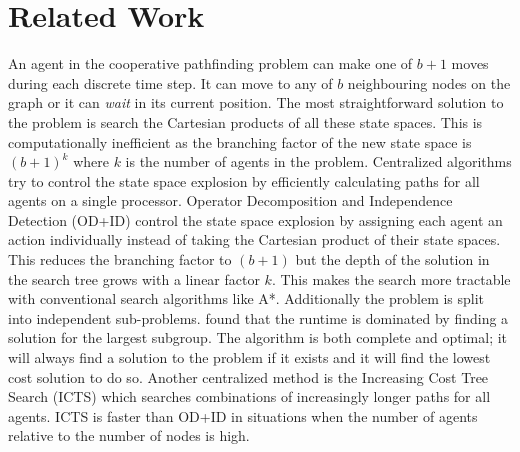\section{Related Work}\label{sec:related}
An agent in the cooperative pathfinding problem can make one of $b+1$ moves 
during each discrete time step. It can move to any of $b$ neighbouring nodes on 
the graph or it can \emph{wait} in its current position. The most 
straightforward 
solution to the problem is search the Cartesian products of all these state 
spaces. This is computationally inefficient \cite{hopcroft1984,sharon2013} as 
the branching factor of the new state space is $(b+1)^k$ where $k$ is the 
number of agents in the problem. Centralized algorithms try to control the 
state space explosion by efficiently calculating paths for all agents on a 
single processor. Operator Decomposition and Independence Detection (OD+ID) 
\cite{standley2010,standley2011} control the state space explosion by 
assigning each agent an action individually instead of taking the Cartesian 
product of their state spaces. This reduces the branching factor to $(b+1)$ but 
the depth of the solution in the search tree grows with a linear factor $k$. 
This makes the search more tractable with conventional search algorithms like 
A*. Additionally the problem is split into independent sub-problems.
\cite{standley2010} found that the runtime is dominated by finding a solution 
for the largest subgroup. The algorithm is both complete and optimal; it will 
always find a solution to the problem if it exists and it will find the lowest 
cost solution to do so. Another centralized method is the Increasing Cost Tree 
Search (ICTS) \cite{sharon2013} which searches combinations of increasingly 
longer paths for all agents. ICTS is faster than OD+ID in situations when the 
number of agents relative to the number of nodes is high.

